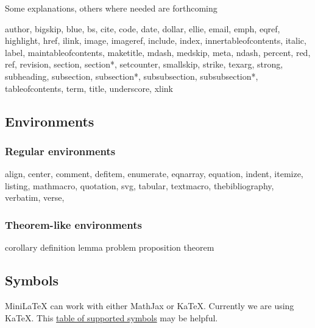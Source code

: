 Some explanations, others where needed are forthcoming

\begin{indent}
author,
bigskip,
blue,
bs,
cite,
code,
date,
dollar,
ellie,
email,
emph,
eqref,
highlight,
href,
ilink,
image,
imageref,
include,
index,
innertableofcontents,
italic,
label,
maintableofcontents,
maketitle,
mdash,
medskip,
meta,
ndash,
percent,
red,
ref,
revision,
section,
section*,
setcounter,
smallskip,
strike,
texarg,
strong,
subheading,
subsection,
subsection*,
subsubsection,
subsubsection*,
tableofcontents,
term,
title,
underscore,
xlink
\end{indent}

\subsection{Environments}

\subsubsection{Regular environments}

\begin{indent}
align,
center,
comment,
defitem,
enumerate,
eqnarray,
equation,
indent,
itemize,
listing,
mathmacro,
quotation,
svg,
tabular,
textmacro,
thebibliography,
verbatim,
verse,
\end{indent}

\subsubsection{Theorem-like environments}

\begin{indent}
corollary
definition
lemma
problem
proposition
theorem
\end{indent}



\subsection{Symbols}

MiniLaTeX can work with either MathJax or KaTeX.  Currently we are using KaTeX.  This
\href{https://katex.org/docs/support_table.html}{table of supported symbols} may be helpful.

